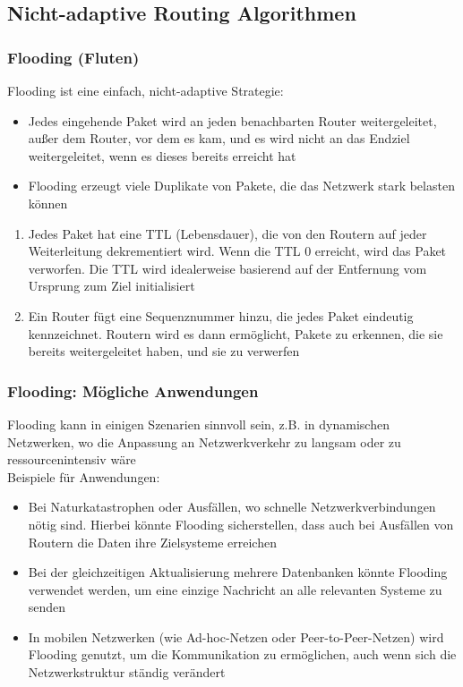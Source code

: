 \subsection{Nicht-adaptive Routing Algorithmen}
\subsubsection*{Flooding (Fluten)}
Flooding ist eine einfach, nicht-adaptive Strategie:
\begin{itemize}
    \item {} Jedes eingehende Paket wird an jeden benachbarten Router weitergeleitet, außer dem Router, vor dem es kam, und es wird nicht an das Endziel weitergeleitet, wenn es dieses bereits erreicht hat
    \item {} Flooding erzeugt viele Duplikate von Pakete, die das Netzwerk stark belasten können
\end{itemize}
\begin{enumerate}
    \item {} Jedes Paket hat eine TTL (Lebensdauer), die von den Routern auf jeder Weiterleitung dekrementiert wird. Wenn die TTL 0 erreicht, wird das Paket verworfen. Die TTL wird idealerweise basierend auf der Entfernung vom Ursprung zum Ziel initialisiert
    \item {} Ein Router fügt eine Sequenznummer hinzu, die jedes Paket eindeutig kennzeichnet. Routern wird es dann ermöglicht, Pakete zu erkennen, die sie bereits weitergeleitet haben, und sie zu verwerfen
\end{enumerate}
\subsubsection*{Flooding: Mögliche Anwendungen}
Flooding kann in einigen Szenarien sinnvoll sein, z.B. in dynamischen Netzwerken, wo die Anpassung an Netzwerkverkehr zu langsam oder zu ressourcenintensiv wäre\\
Beispiele für Anwendungen:
\begin{itemize}
    \item {} Bei Naturkatastrophen oder Ausfällen, wo schnelle Netzwerkverbindungen nötig sind. Hierbei könnte Flooding sicherstellen, dass auch bei Ausfällen von Routern die Daten ihre Zielsysteme erreichen
    \item {} Bei der gleichzeitigen Aktualisierung mehrere Datenbanken könnte Flooding verwendet werden, um eine einzige Nachricht an alle relevanten Systeme zu senden
    \item {} In mobilen Netzwerken (wie Ad-hoc-Netzen oder Peer-to-Peer-Netzen) wird Flooding genutzt, um die Kommunikation zu ermöglichen, auch wenn sich die Netzwerkstruktur ständig verändert
\end{itemize}
